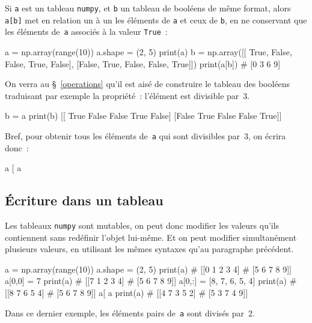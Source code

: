 \documentclass[10pt,fleqn]{article} %
\begin{document}
Si \texttt{a} est un tableau \texttt{numpy}, et \texttt{b} un tableau
de booléens de même format, alors \texttt{a[b]} met en relation un à
un les éléments de \texttt{a} et ceux de \texttt{b}, en ne conservant
que les éléments de~\texttt{a} associés à la valeur \texttt{True}~:
\begin{python}
a = np.array(range(10))
a.shape = (2, 5)
print(a)
b = np.array([[ True, False, False,  True, False],
              [False,  True, False, False,  True]])
print(a[b])
# [0 3 6 9]  
\end{python}

On verra au §~\ref{operations} qu'il est aisé de construire le tableau
des booléens traduisant par exemple la propriété~: l'élément est
divisible par~$3$.

\begin{python}
b = a %
print(b)
[[ True False False  True False]
 [False  True False False  True]]  
\end{python}

Bref, pour obtenir tous les éléments de~\texttt{a} qui sont divisibles
par~$3$, on écrira donc~: 
\begin{python}
a [ a %
\end{python}

\subsection{Écriture dans un tableau}

Les tableaux \texttt{numpy} sont mutables, on peut donc modifier les
valeurs qu'ils contiennent sans redéfinir l'objet lui-même. Et on peut
modifier simultanément plusieurs valeurs, en utilisant les mêmes
syntaxes qu'au paragraphe précédent.

\begin{py}
\begin{multicols}{4}
\begin{python}
a = np.array(range(10))
a.shape = (2, 5)
print(a)
# [[0 1 2 3 4]
#  [5 6 7 8 9]]
a[0,0] = 7
print(a)
# [[7 1 2 3 4]
#  [5 6 7 8 9]]
a[0,:] = [8, 7, 6, 5, 4]
print(a)
# [[8 7 6 5 4]
#  [5 6 7 8 9]]
a[ a %
print(a)
# [[4 7 3 5 2]
#  [5 3 7 4 9]]  
\end{python}
\end{multicols}
\end{py}
Dans ce dernier exemple, les éléments pairs de~\texttt{a} sont divisés
par~$2$.
\end{document}
